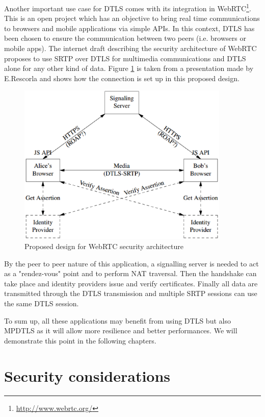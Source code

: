 Another important use case for DTLS comes with its integration in WebRTC\footnote{\url{http://www.webrtc.org/}}. This is an open project which has an objective to bring real time communications to browsers and mobile applications via simple APIs. In this context, DTLS has been chosen to ensure the communication between two peers (i.e. browsers or mobile apps). The internet draft describing the security architecture of WebRTC \cite{ietf-rtcweb-security-arch} proposes to use SRTP over DTLS for multimedia communications and DTLS alone for any other kind of data. Figure \ref{fig:webrtc} is taken from a presentation \cite{rescorla2011proposed} made by E.Rescorla and shows how the connection is set up in this proposed design.  

\begin{figure}[!ht]
\centering
\includegraphics[width=0.9\textwidth]{images/webrtc.eps}
\caption{Proposed design for WebRTC security architecture}
\label{fig:webrtc}
\end{figure}

By the peer to peer nature of this application, a signalling server is needed to act as a "rendez-vous" point and to perform NAT traversal. Then the handshake can take place and identity providers issue and verify certificates. Finally all data are transmitted through the DTLS transmission and multiple SRTP sessions can use the same DTLS session. 

To sum up, all these applications may benefit from using DTLS but also MPDTLS as it will allow more resilience and better performances. We will demonstrate this point in the following chapters.

\section{Security considerations}
\label{sec:tls-sec}


